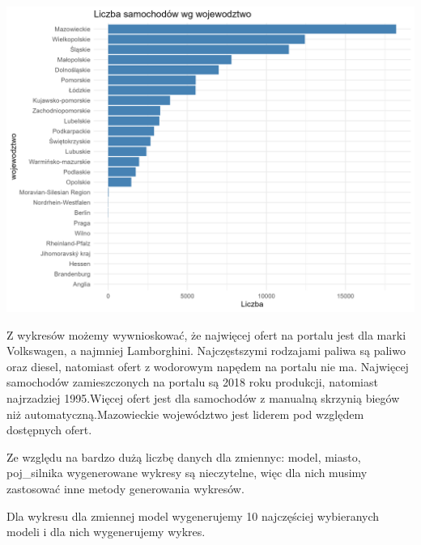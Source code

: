 \documentclass[
]{article}
\begin{document}
\includegraphics[width=1\linewidth]{analiza/wykres_wojewodztwo}

Z wykresów możemy wywnioskować, że najwięcej ofert na portalu jest dla
marki Volkswagen, a najmniej Lamborghini. Najczęstszymi rodzajami paliwa
są paliwo oraz diesel, natomiast ofert z wodorowym napędem na portalu
nie ma. Najwięcej samochodów zamieszczonych na portalu są 2018 roku
produkcji, natomiast najrzadziej 1995.Więcej ofert jest dla samochodów z
manualną skrzynią biegów niż automatyczną.Mazowieckie województwo jest
liderem pod względem dostępnych ofert.

Ze względu na bardzo dużą liczbę danych dla zmiennyc: model, miasto,
poj\_silnika wygenerowane wykresy są nieczytelne, więc dla nich musimy
zastosować inne metody generowania wykresów.

Dla wykresu dla zmiennej model wygenerujemy 10 najczęściej wybieranych
modeli i dla nich wygenerujemy wykres.
\end{document}
